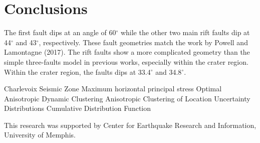 \documentclass[draft]{agujournal2018}
\begin{document}
\section{Conclusions}
The first fault dips at an angle of 60$^\circ$ while the other two main rift faults dip at 44$^\circ$ and 43$^\circ$, respectively. These fault geometries match the work by Powell and Lamontagne (2017). The rift faults show a more complicated geometry than the simple three-faults model in previous works, especially within the crater region. Within the crater region, the faults dips at 33.4$^\circ$ and 34.8$^\circ$. 




















\begin{acronyms}
  Charlevoix Seismic Zone
  Maximum horizontal principal stress 
  Optimal Anisotropic Dynamic Clustering  
   Anisotropic Clustering of Location Uncertainty Distributions
  Cumulative Distribution Function
\end{acronyms}


\acknowledgments
This research was supported by Center for Earthquake Research and Information, University of Memphis.




















\end{document}
